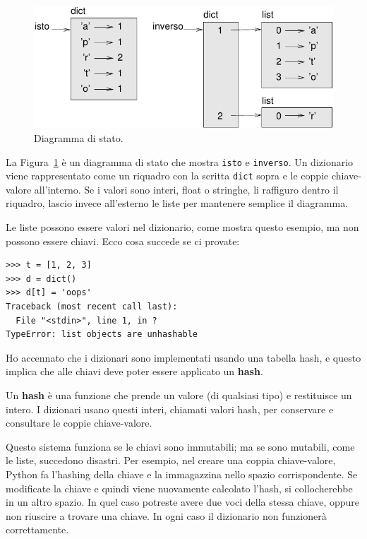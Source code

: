 \documentclass[10pt]{book}
\begin{document}
\begin{figure}
\centerline
{\includegraphics[scale=0.8]{figs/dict1.pdf}}
\caption{Diagramma di stato.}
\label{fig.dict1}
\end{figure}

La Figura~\ref{fig.dict1} è un diagramma di stato che mostra {\tt isto} e {\tt inverso}.
Un dizionario viene rappresentato come un riquadro con la scritta {\tt dict} sopra e le coppie chiave-valore all'interno. Se i valori sono interi, float o stringhe, li raffiguro dentro il riquadro, lascio invece all'esterno le liste per mantenere semplice il diagramma.

Le liste possono essere valori nel dizionario, come mostra questo esempio, ma non possono essere chiavi. Ecco cosa succede se ci provate:


\begin{verbatim}
>>> t = [1, 2, 3]
>>> d = dict()
>>> d[t] = 'oops'
Traceback (most recent call last):
  File "<stdin>", line 1, in ?
TypeError: list objects are unhashable
\end{verbatim}
%
Ho accennato che i dizionari sono implementati usando una tabella hash, e questo implica che alle chiavi deve poter essere applicato un {\bf hash}.

Un {\bf hash} è una funzione che prende un valore (di qualsiasi tipo) e restituisce un intero. I dizionari usano questi interi, chiamati valori hash, per conservare e consultare le coppie chiave-valore.

Questo sistema funziona se le chiavi sono immutabili; ma se sono mutabili, come le liste, succedono disastri. Per esempio, nel creare una coppia chiave-valore, Python fa l'hashing della chiave e la immagazzina nello spazio corrispondente. Se modificate la chiave e quindi viene nuovamente calcolato l'hash, si collocherebbe in un altro spazio. In quel caso potreste avere due voci della stessa chiave, oppure non riuscire a trovare una chiave. In ogni caso il dizionario non funzionerà correttamente.
\end{document}
